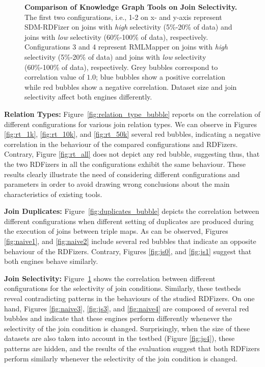 \begin{figure}[!tb]
    \caption{\textbf{Comparison of Knowledge Graph Tools on Join Selectivity.} The first two configurations, i.e., 1-2 on x- and y-axis represent SDM-RDFizer on joins with \textit{high} selectivity (5\%-20\% of data) and joins with \textit{low} selectivity (60\%-100\% of data), respectively.  Configurations 3 and 4 represent RMLMapper on joins with \textit{high} selectivity (5\%-20\% of data) and joins with \textit{low} selectivity (60\%-100\% of data), respectively. Grey bubbles correspond to correlation value of $1.0$; blue bubbles show a positive correlation while red bubbles show a negative correlation. Dataset size and join selectivity affect both engines differently.}
    \label{fig:joinselectivity_bubble}
\end{figure}



\noindent \textbf{Relation Types:}
Figure~\ref{fig:relation_type_bubble} reports on the correlation of different configurations for various join relation types. We can observe in Figures \ref{fig:rt_1k}, \ref{fig:rt_10k}, and \ref{fig:rt_50k} several red bubbles, indicating a negative correlation in the behaviour of the compared configurations and RDFizers. Contrary, Figure \ref{fig:rt_all} does not depict any red bubble, suggesting thus, that the two RDFizers in all the configurations exhibit the same behaviour. These results clearly illustrate the need of considering different configurations and parameters in order to avoid drawing wrong conclusions about the main characteristics of existing tools. 


\noindent \textbf{Join Duplicates:}
Figure~\ref{fig:duplicates_bubble} depicts the correlation between different configurations when different setting of duplicates are produced during the execution of joins between triple maps. As can be observed, Figures \ref{fig:naive1}, and \ref{fig:naive2} include several red bubbles that indicate an opposite behaviour of the RDFizers. Contrary, Figures \ref{fig:js0}, and \ref{fig:js1} suggest that both engines behave similarly. 


\noindent \textbf{Join Selectivity:}
Figure~\ref{fig:joinselectivity_bubble} shows the correlation between different configurations for the selectivity of join conditions. Similarly, these testbeds reveal contradicting patterns in the behaviours of the studied RDFizers. On one hand, Figures \ref{fig:naive3}, \ref{fig:js3}, and \ref{fig:naive4} are composed of several red bubbles and indicate that these engines perform differently whenever the selectivity of the join condition is changed. Surprisingly,  when the size of these datasets are also taken into account in the testbed (Figure \ref{fig:js4}), these patterns are hidden, and the results of the evaluation suggest that both RDFizers perform similarly whenever the selectivity of the join condition is changed. 

